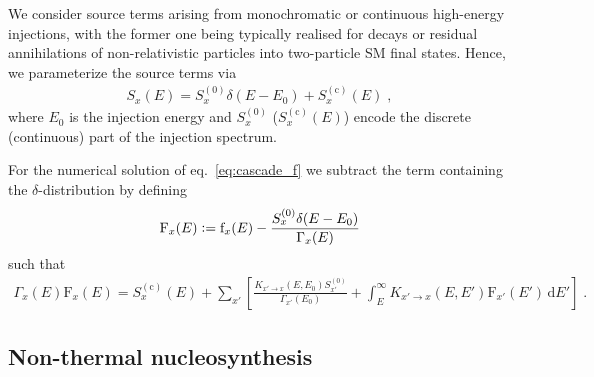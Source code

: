 \documentclass[11pt,a4paper]{article}
\newcommand{\fpdi}{\mathrm{f}}
\newcommand{\Fpdi}{\mathrm{F}}
\renewcommand{\d}{\text{d}}
\newcommand{\eqsp}{\;}
\newcommand{\X}{x}
\newcommand{\ldefine}{\vcentcolon=}
\begin{document}
We consider source terms arising from monochromatic or continuous high-energy injections, with the former one being typically realised for decays or residual annihilations of non-relativistic particles into two-particle SM final states.
Hence, we parameterize the source terms via
\begin{align}
S_\X(E) = S_\X^{(0)} \delta(E-E_0) + S_\X^{(\text{c})}(E)\eqsp,
\label{eq:SXE_definition}
\end{align}
where $E_0$ is the injection energy and $S_\X^{(0)}$ ($S_\X^{(\text{c})}(E)$) encode the discrete (continuous) part of the injection spectrum.


For the numerical solution of eq.~\eqref{eq:cascade_f} we subtract the term containing the $\delta$-distribution by defining
\begin{align}
\Fpdi_\X(E) \ldefine \fpdi_\X(E) - \frac{S_\X^{(0)} \delta(E-E_0)}{\Gamma_\X(E)}
\label{eq:Ff_relation}
\end{align}
such that
\begin{align}
\Gamma_\X(E) \Fpdi_\X(E) = S_{\X}^{(\text{c})}(E) + \sum_{\X'} \left[ \frac{K_{\X' \to \X} (E, E_0) S_{\X'}^{(0)}}{\Gamma_{\X'} (E_0)} + \int_{E}^{\infty} K_{\X' \to \X} (E, E') \Fpdi_{\X'}(E')\,\d E'\right] \eqsp.
\label{eq:cascade_full}
\end{align}

\subsection{Non-thermal nucleosynthesis}
\end{document}
